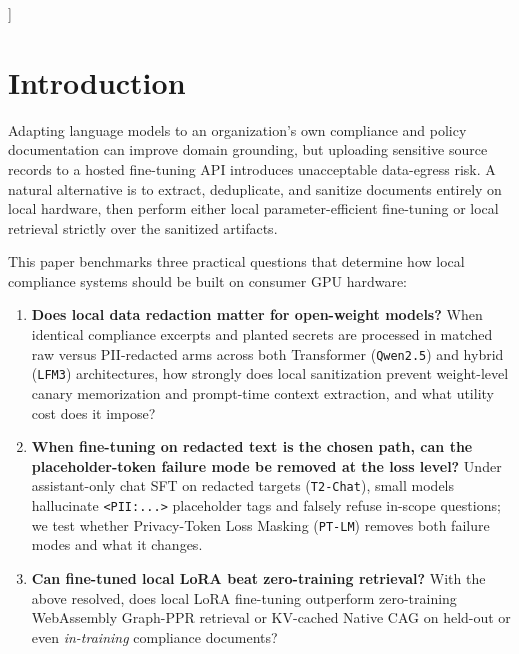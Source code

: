 \documentclass{article}
\begin{document}
\begin{abstract}
repair, zero-training retrieval remains the stronger default at this scale: Dual-CSR Graph-PPR (\texttt{verisieve\_graph.wasm}) outperforms every closed-book LoRA arm, including \texttt{PT-LM}, on held-out compliance QA across both blinded \texttt{qwen2.5:7b} and cross-family \texttt{llama3.2:3b} judges ($p = 0.0005$ on F1), at lower latency. PT-LM's niche is therefore the case where weight-held redacted fine-tuning is required for reasons outside QA: offline or re-indexing-free deployment.
\end{abstract}
]

\section{Introduction}
\label{sec:intro}

Adapting language models to an organization's own compliance and policy documentation can improve domain grounding, but uploading sensitive source records to a hosted fine-tuning API introduces unacceptable data-egress risk. A natural alternative is to extract, deduplicate, and sanitize documents entirely on local hardware, then perform either local parameter-efficient fine-tuning or local retrieval strictly over the sanitized artifacts.

This paper benchmarks three practical questions that determine how local compliance systems should be built on consumer GPU hardware:
\begin{enumerate}
    \item \textbf{Does local data redaction matter for open-weight models?} When identical compliance excerpts and planted secrets are processed in matched raw versus PII-redacted arms across both Transformer (\texttt{Qwen2.5}) and hybrid (\texttt{LFM3}) architectures, how strongly does local sanitization prevent weight-level canary memorization and prompt-time context extraction, and what utility cost does it impose?
    \item \textbf{When fine-tuning on redacted text is the chosen path, can the placeholder-token failure mode be removed at the loss level?} Under assistant-only chat SFT on redacted targets (\texttt{T2-Chat}), small models hallucinate \texttt{<PII:...>} placeholder tags and falsely refuse in-scope questions; we test whether Privacy-Token Loss Masking (\texttt{PT-LM}) removes both failure modes and what it changes.
    \item \textbf{Can fine-tuned local LoRA beat zero-training retrieval?} With the above resolved, does local LoRA fine-tuning outperform zero-training WebAssembly Graph-PPR retrieval or KV-cached Native CAG on held-out or even \emph{in-training} compliance documents?
\end{enumerate}
\end{document}

